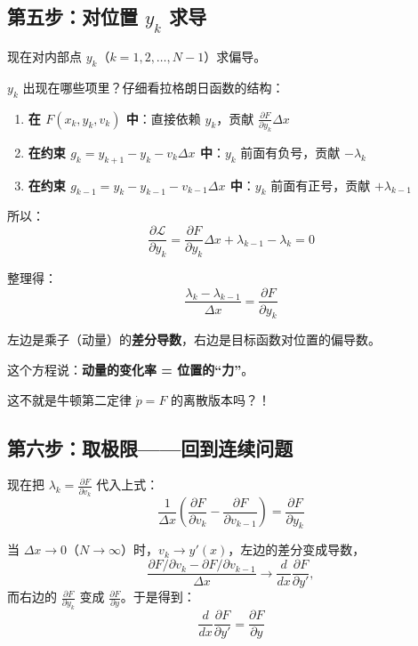 \subsection{第五步：对位置 $y_k$ 求导}

现在对内部点 $y_k$（$k = 1, 2, \ldots, N-1$）求偏导。

$y_k$ 出现在哪些项里？仔细看拉格朗日函数的结构：

\begin{enumerate}
    \item \textbf{在 $F(x_k, y_k, v_k)$ 中}：直接依赖 $y_k$，贡献 $\frac{\partial F}{\partial y_k} \Delta x$
    
    \item \textbf{在约束 $g_k = y_{k+1} - y_k - v_k \Delta x$ 中}：$y_k$ 前面有负号，贡献 $-\lambda_k$
    
    \item \textbf{在约束 $g_{k-1} = y_k - y_{k-1} - v_{k-1} \Delta x$ 中}：$y_k$ 前面有正号，贡献 $+\lambda_{k-1}$
\end{enumerate}

所以：
\[
\frac{\partial \mathcal{L}}{\partial y_k} = \frac{\partial F}{\partial y_k} \Delta x + \lambda_{k-1} - \lambda_k = 0
\]

整理得：
\begin{equation}
\frac{\lambda_k - \lambda_{k-1}}{\Delta x} = \frac{\partial F}{\partial y_k}
\end{equation}

\begin{physicalmeaning}
左边是乘子（动量）的\textbf{差分导数}，右边是目标函数对位置的偏导数。

这个方程说：\textbf{动量的变化率 = 位置的“力”}。

这不就是牛顿第二定律 $\dot{p} = F$ 的离散版本吗？！
\end{physicalmeaning}

\subsection{第六步：取极限——回到连续问题}

现在把 $\lambda_k = \frac{\partial F}{\partial v_k}$ 代入上式：
\[
\frac{1}{\Delta x} \left( \frac{\partial F}{\partial v_k} - \frac{\partial F}{\partial v_{k-1}} \right) = \frac{\partial F}{\partial y_k}
\]

当 $\Delta x \to 0$（$N \to \infty$）时，$v_k \to y'(x)$，左边的差分变成导数，
\[
\frac{\partial F / \partial v_k - \partial F / \partial v_{k-1}}{\Delta x} \to \frac{d}{dx} \frac{\partial F}{\partial y'},
\]
而右边的 $\frac{\partial F}{\partial y_k}$ 变成 $\frac{\partial F}{\partial y}$。于是得到：
\[
\frac{d}{dx} \frac{\partial F}{\partial y'} = \frac{\partial F}{\partial y}
\]

